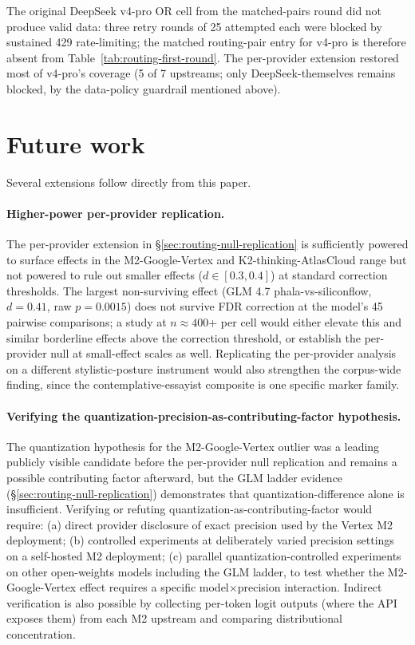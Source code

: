 \documentclass[11pt,a4paper]{article}
\begin{document}
The original DeepSeek v4-pro OR cell from the matched-pairs round did not produce valid data: three retry rounds of 25 attempted each were blocked by sustained 429 rate-limiting; the matched routing-pair entry for v4-pro is therefore absent from Table~\ref{tab:routing-first-round}. The per-provider extension restored most of v4-pro's coverage (5 of 7 upstreams; only DeepSeek-themselves remains blocked, by the data-policy guardrail mentioned above).

\section{Future work}
\label{sec:future}

Several extensions follow directly from this paper.

\paragraph{Higher-power per-provider replication.} The per-provider extension in \S\ref{sec:routing-null-replication} is sufficiently powered to surface effects in the M2-Google-Vertex and K2-thinking-AtlasCloud range but not powered to rule out smaller effects ($d \in [0.3, 0.4]$) at standard correction thresholds. The largest non-surviving effect (GLM 4.7 phala-vs-siliconflow, $d{=}0.41$, raw $p{=}0.0015$) does not survive FDR correction at the model's 45 pairwise comparisons; a study at $n \approx 400$+ per cell would either elevate this and similar borderline effects above the correction threshold, or establish the per-provider null at small-effect scales as well. Replicating the per-provider analysis on a different stylistic-posture instrument would also strengthen the corpus-wide finding, since the contemplative-essayist composite is one specific marker family.

\paragraph{Verifying the quantization-precision-as-contributing-factor hypothesis.} The quantization hypothesis for the M2-Google-Vertex outlier was a leading publicly visible candidate before the per-provider null replication and remains a possible contributing factor afterward, but the GLM ladder evidence (\S\ref{sec:routing-null-replication}) demonstrates that quantization-difference alone is insufficient. Verifying or refuting quantization-as-contributing-factor would require: (a) direct provider disclosure of exact precision used by the Vertex M2 deployment; (b) controlled experiments at deliberately varied precision settings on a self-hosted M2 deployment; (c) parallel quantization-controlled experiments on other open-weights models including the GLM ladder, to test whether the M2-Google-Vertex effect requires a specific model$\times$precision interaction. Indirect verification is also possible by collecting per-token logit outputs (where the API exposes them) from each M2 upstream and comparing distributional concentration.
\end{document}
